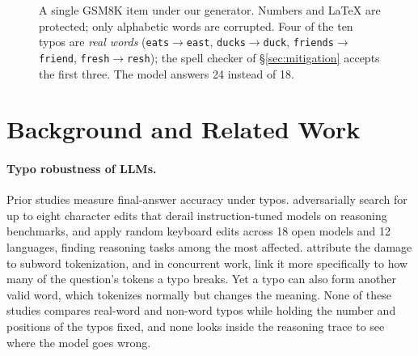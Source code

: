 \documentclass[11pt]{article}
\begin{document}
\begin{figure}[t]
\centering
\footnotesize
\setlength{\fboxsep}{4pt}
\caption{A single GSM8K item under our generator. Numbers and LaTeX are protected; only alphabetic words are corrupted. Four of the ten typos are \emph{real words} (\texttt{eats$\rightarrow$east}, \texttt{ducks$\rightarrow$duck}, \texttt{friends$\rightarrow$friend}, \texttt{fresh$\rightarrow$resh}); the spell checker of \S\ref{sec:mitigation} accepts the first three. The model answers 24 instead of 18.}
\label{fig:example}
\end{figure}


\section{Background and Related Work}

\paragraph{Typo robustness of LLMs.} Prior studies measure final-answer accuracy under typos. \citet{gan2024} adversarially search for up to eight character edits that derail instruction-tuned models on reasoning benchmarks, and \citet{zhao2026} apply random keyboard edits across 18 open models and 12 languages, finding reasoning tasks among the most affected. \citet{chai2024} attribute the damage to subword tokenization, and in concurrent work, \citet{hu2026} link it more specifically to how many of the question's tokens a typo breaks. Yet a typo can also form another valid word, which tokenizes normally but changes the meaning. None of these studies compares real-word and non-word typos while holding the number and positions of the typos fixed, and none looks inside the reasoning trace to see where the model goes wrong.
\end{document}
